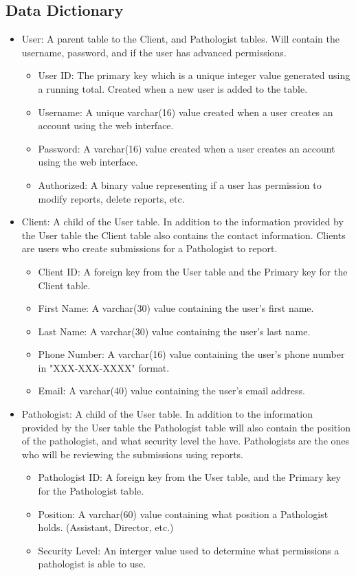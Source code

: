 \documentclass[onecolumn, draftclsnofoot,10pt, compsoc]{IEEEtran}
\begin{document}
\subsection{Data Dictionary}
\begin{itemize}
\item User:\newline
A parent table to the Client, and Pathologist tables. Will contain the username, password, and if the user has advanced permissions.
\begin{itemize}
\item User ID: The primary key which is a unique integer value generated using a running total. Created when a new user is added to the table.
\item Username: A unique varchar(16) value created when a user creates an account using the web interface.
\item Password: A varchar(16) value created when a user creates an account using the web interface.
\item Authorized: A binary value representing if a user has permission to modify reports, delete reports, etc.
\end{itemize}

\item Client:\newline
A child of the User table. In addition to the information provided by the User table the Client table also contains the contact information. Clients are users who create submissions for a Pathologist to report.
\begin{itemize} 
\item Client ID: A foreign key from the User table and the Primary key for the Client table. 
\item First Name: A varchar(30) value containing the user's first name.
\item Last Name: A varchar(30) value containing the user's last name.
\item Phone Number: A varchar(16) value containing the user's phone number in "XXX-XXX-XXXX" format.
\item Email: A varchar(40) value containing the user's email address.
\end{itemize}

\item Pathologist:\newline
A child of the User table. In addition to the information provided by the User table the Pathologist table will also contain the position of the pathologist, and what security level the have. Pathologists are the ones who will be reviewing the submissions using reports.
\begin{itemize}
\item Pathologist ID: A foreign key from the User table, and the Primary key for the Pathologist table.
\item Position: A varchar(60) value containing what position a Pathologist holds. (Assistant, Director, etc.)
\item Security Level: An interger value used to determine what permissions a pathologist is able to use. 
\end{itemize}


\end{itemize}
\end{document}
